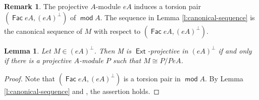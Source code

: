 \documentclass[12pt,a4paper,reqno]{amsart}
\newtheorem{lemma}[theorem]{Lemma}
\theoremstyle{definition}
\newtheorem{remark}[theorem]{Remark}
\newcommand{\opname}[1]{\operatorname{\mathsf{#1}}}
\renewcommand{\mod}{\opname{mod}\nolimits}
\newcommand{\Fac}{\opname{Fac}}
\newcommand{\Ext}{\opname{Ext}}
\begin{document}
\begin{remark}\label{rmk:canonical-sequence}
The projective $A$-module $eA$ induces a torsion pair $(\Fac eA, (eA)^\perp)$ of $\mod A$.
The sequence in Lemma \ref{l:canonical-sequence} is the canonical sequence of $M$ with respect to  $(\Fac eA, (eA)^\perp)$.
\end{remark}

\begin{lemma}\label{l:Ext-proj}
Let $M \in (eA)^\perp$. Then M is $\Ext$-projective in $(eA)^\perp$ if and only if there is a projective $A$-module $P$ such that $M \cong P/PeA$.
\end{lemma}
\begin{proof}
Note that $(\Fac eA, (eA)^\perp)$ is a torsion pair in $\mod A$. By Lemma \ref{l:canonical-sequence} and \cite[Proposition VI.1.11 (b)]{ASS}, the assertion holds.
\end{proof} 
\end{document}
